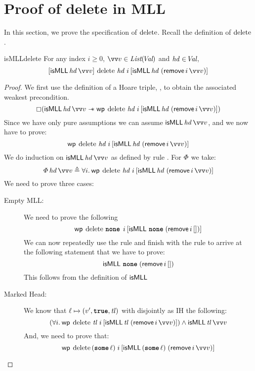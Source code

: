 \documentclass[thesis.tex]{subfiles}
\begin{document}
\section{Proof of delete in MLL}
\label{sec:proofmll}
In this section, we prove the specification of $\operatorname{delete}$. Recall the definition of $\operatorname{delete}$.
\MLLDeleteProg
\\
\begin{lemma}{}{isMLLdelete}
    For any index $i \ge 0$, $\vect{\val} \in \List(\Val)$  and $\mathit{hd}\in\kern-0.2em\textit{Val}$,
    \[
        \hoare{\isMLL\, \hd\, \vect{\val}}{\MLLdelete\, \hd\; \iindex }{\isMLL\, \hd\; (\textlog{remove}\, \iindex\, \vect{v})}
    \]
\end{lemma}
\begin{proof}
    We first use the definition of a Hoare triple, , to obtain the associated weakest precondition.
    \[\always(\isMLL\, \hd\, \vect{\val} \wand \wpre{\MLLdelete\, \hd\; \iindex}{\isMLL\, \hd\; (\textlog{remove}\, \iindex\, \vect{v})})\]
    Since we have only pure assumptions we can assume
    $\isMLL\, \hd\, \vect{\val}$, and we now have to prove:
    \[\wpre{\MLLdelete\, \hd\; \iindex}{\isMLL\, \hd\; (\textlog{remove}\, \iindex\, \vect{v})}\]
    We do induction on $\isMLL\, \hd\, \vect{\val}$ as defined by rule . For $\varPhi$ we take:
    \[
        \pred\, \hd\, \vect{\val} \eqdef \All \iindex. \wpre{\MLLdelete\, \hd\; \iindex}{\isMLL\, \hd\; (\textlog{remove}\, \iindex\, \vect{v})}
    \]
    We need to prove three cases:
    \begin{description}
        \item[Empty MLL:] We need to prove the following
              \[\wpre{\MLLdelete\, \None\; \iindex}{\isMLL\, \None\; (\textlog{remove}\, \iindex\, [])}\]
              We can now repeatedly use the  rule and finish with the rule  to arrive at the following statement that we have to prove:
              \[\textsf{\upshape isMLL}\, \operatorname{\texttt{\upshape \bfseries none}}\; (\textsf{\upshape remove}\, i\, [])\]
              This follows from the definition of $\textsf{\upshape isMLL}$
        \item[Marked Head:] We know that $\loc \fmapsto (\val', \True, \tl)$ with disjointly as IH the following:
              \[\left(\All \iindex. \wpre{\MLLdelete\, \tl\; \iindex}{\isMLL\, \tl\; (\textlog{remove}\, \iindex\, \vect{\val})}\right) \land \isMLL\, \tl\, \vect{\val}\]
              And, we need to prove that:
              \[\wpre{\MLLdelete\, (\Some \loc)\; \iindex}{\isMLL\, (\Some \loc)\; (\textlog{remove}\, \iindex\, \vect{v})}\]

\end{description}
\end{proof}
\end{document}
